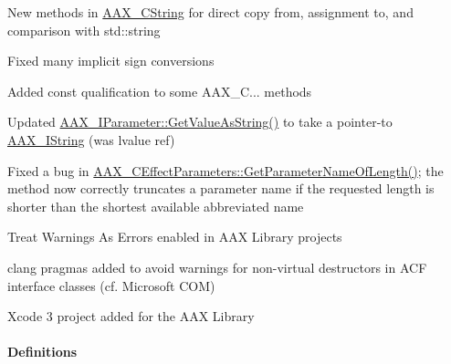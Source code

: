 \begin{DoxyItemize}
\item New methods in \hyperlink{a00042}{A\+A\+X\+\_\+\+C\+String} for direct copy from, assignment to, and comparison with std\+::string  
\item Fixed many implicit sign conversions  
\item Added {\ttfamily const} qualification to some A\+A\+X\+\_\+\+C... methods  
\item Updated \hyperlink{a00108_ab0d640c37120decbbe48f0c1483770f9}{A\+A\+X\+\_\+\+I\+Parameter\+::\+Get\+Value\+As\+String()} to take a pointer-\/to \hyperlink{a00113}{A\+A\+X\+\_\+\+I\+String} (was lvalue ref)  
\item Fixed a bug in \hyperlink{a00018_a16356608f6cd2748ebee908427db7a0f}{A\+A\+X\+\_\+\+C\+Effect\+Parameters\+::\+Get\+Parameter\+Name\+Of\+Length()}; the method now correctly truncates a parameter name if the requested length is shorter than the shortest available abbreviated name  
\item Treat Warnings As Errors enabled in A\+A\+X Library projects  
\item clang pragmas added to avoid warnings for non-\/virtual destructors in A\+C\+F interface classes (cf. Microsoft C\+O\+M)  
\item Xcode 3 project added for the A\+A\+X Library  
\end{DoxyItemize}\hypertarget{a00375_aax_sdk_2p1p0_Definitions}{}\paragraph{Definitions}\label{a00375_aax_sdk_2p1p0_Definitions}


